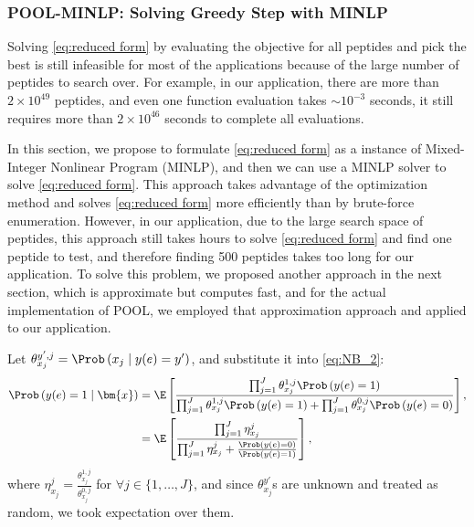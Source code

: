 \subsubsection{POOL-MINLP: Solving Greedy Step with MINLP} \label{sec:MINLP approach}
Solving \eqref{eq:reduced form} by evaluating the objective for all peptides and pick the best is still infeasible
for most of the applications because of the large number of peptides to search over. For example, in our application,
there are more than $2 \times 10^{49}$ peptides, and even one function evaluation takes $\sim 10^{-3}$ seconds, it still
requires more than $2 \times 10^{46}$ seconds to complete all evaluations. 

In this section, we propose to formulate \eqref{eq:reduced form} as a instance of Mixed-Integer Nonlinear Program (MINLP), 
and then we can use a MINLP solver to solve \eqref{eq:reduced form}. This approach takes advantage of the optimization
method and solves \eqref{eq:reduced form} more efficiently than by brute-force enumeration. However, in our application,
due to the large search space of peptides, this approach still takes hours to solve \eqref{eq:reduced form} and find one
peptide to test, and therefore finding 500 peptides takes too long for our application. To solve this problem, we proposed another
approach in the next section, which is approximate but computes fast, and for the actual implementation of POOL, we employed
that approximation approach and applied to our application.

Let $\theta^{y', j}_{x_j} = \Prob \left( x_j \mid y(e) = y' \right)$, and substitute it into \eqref{eq:NB_2}:
\begin{equation}
\begin{split}
  \Prob \left(y(e \right) = 1 \mid \bm{x}) &= \E \left[ \frac{\prod_{j=1}^J \theta^{1, j}_{x_j} \Prob\left( y(e)=1 \right)}{\prod_{j=1}^J \theta^{1, j}_{x_j} \Prob\left( y(e)=1 \right) + \prod_{j=1}^J \theta^{0, j}_{x_j} \Prob\left( y(e)=0 \right)} \right], \\
  &= \E \left[ \frac{\prod_{j = 1}^J \eta^j_{x_j}}{\prod_{j=1}^J \eta^j_{x_j} + \frac{\Prob \left(y(e) = 0 \right)}{\Prob \left( y(e) = 1 \right)}} \right],
  \label{eq:MINLP_2}
\end{split}
\end{equation}
where $\eta^j_{x_j} = \frac{\theta^{1,j}_{x_j}}{\theta^{0,j}_{x_j}}$ for $\forall j \in \{1,\ldots,J\}$, and since $\theta^{y'}_{x_j}$s are unknown and treated as random, we took expectation over them.

